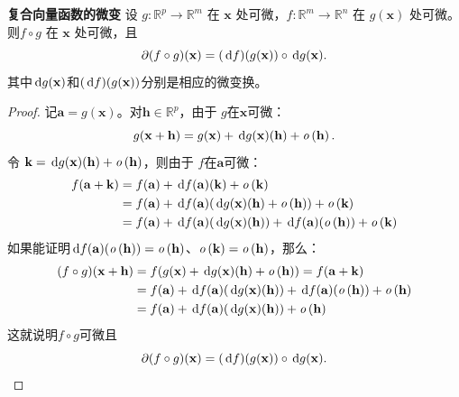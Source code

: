\documentclass[12pt,UTF8]{ctexbook}
\begin{document}
\begin{appendix}
\begin{tm}{\textbf{复合向量函数的微变}}
    设 $g:\mathbb{R}^p\to\mathbb{R}^m$ 在 $\mathbf{x}$ 处可微，$f:\mathbb{R}^m\to\mathbb{R}^n$ 在 $g(\mathbf{x})$ 处可微。则$f\circ g$ 在 $\mathbf{x}$ 处可微，且
    $$ \partial (f \circ g) (\mathbf{x}) = (\,\mathrm{d} f)(g(\mathbf{x}))\circ \,\mathrm{d} g(\mathbf{x}). $$
    其中$\,\mathrm{d} g(\mathbf{x})$和$(\,\mathrm{d} f)(g(\mathbf{x}))$分别是相应的微变换。
\end{tm}
\begin{proof}
    记$\mathbf{a}=g(\mathbf{x})$。对$\mathbf{h}\in\mathbb{R}^p$，由于 $g$在$\mathbf{x}$可微：
    $$ g(\mathbf{x}+\mathbf{h}) = g(\mathbf{x}) + \,\mathrm{d} g(\mathbf{x})(\mathbf{h}) + \mathit{o}\left(\mathbf{h}\right).$$
    令 $\mathbf{k} = \,\mathrm{d} g(\mathbf{x})(\mathbf{h}) + \mathit{o}\left(\mathbf{h}\right)$，则由于 $f$在$\mathbf{a}$可微：
    \begin{align*}
        f(\mathbf{a}+\mathbf{k}) &= f(\mathbf{a}) + \,\mathrm{d} f(\mathbf{a})(\mathbf{k}) + \mathit{o}\left(\mathbf{k}\right)\\
         &= f(\mathbf{a}) + \,\mathrm{d} f(\mathbf{a})(\,\mathrm{d} g(\mathbf{x})(\mathbf{h}) + \mathit{o}\left(\mathbf{h}\right)) + \mathit{o}\left(\mathbf{k}\right) \\
         &= f(\mathbf{a}) + \,\mathrm{d} f(\mathbf{a})(\,\mathrm{d} g(\mathbf{x})(\mathbf{h})) + \,\mathrm{d} f(\mathbf{a})(\mathit{o}\left(\mathbf{h}\right)) + \mathit{o}\left(\mathbf{k}\right) 
    \end{align*}
    如果能证明$\,\mathrm{d} f(\mathbf{a})(\mathit{o}\left(\mathbf{h}\right)) = \mathit{o}\left(\mathbf{h}\right)$、$\mathit{o}\left(\mathbf{k}\right)= \mathit{o}\left(\mathbf{h}\right)$，那么：
    \begin{align*}
        (f\circ g)(\mathbf{x}+\mathbf{h}) &= f(g(\mathbf{x}) + \,\mathrm{d} g(\mathbf{x})(\mathbf{h}) + \mathit{o}\left(\mathbf{h}\right)) = f(\mathbf{a}+\mathbf{k})\\
         &= f(\mathbf{a}) + \,\mathrm{d} f(\mathbf{a})(\,\mathrm{d} g(\mathbf{x})(\mathbf{h})) + \,\mathrm{d} f(\mathbf{a})(\mathit{o}\left(\mathbf{h}\right)) + \mathit{o}\left(\mathbf{h}\right) \\
        &= f(\mathbf{a}) + \,\mathrm{d} f(\mathbf{a})(\,\mathrm{d} g(\mathbf{x})(\mathbf{h})) + \mathit{o}\left(\mathbf{h}\right)
    \end{align*}
    这就说明$f\circ g$可微且
    $$ \partial (f \circ g) (\mathbf{x}) = (\,\mathrm{d} f)(g(\mathbf{x}))\circ \,\mathrm{d} g(\mathbf{x}). $$
    

\end{proof}
\end{appendix}
\end{document}
